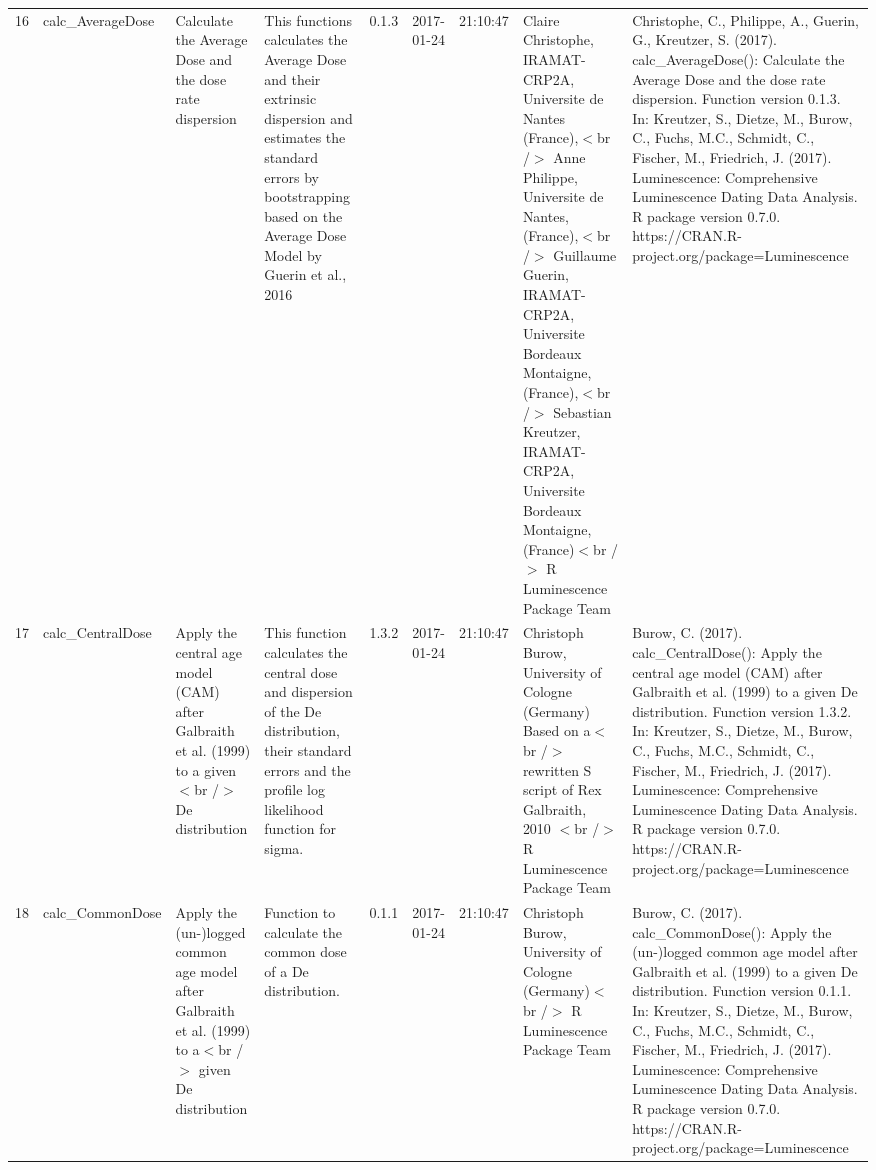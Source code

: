 \begin{table}[ht]
\begin{tabular}{rllllllll}
 \\ 
  16 & calc\_AverageDose & Calculate the Average Dose and the dose rate dispersion & This functions calculates the Average Dose and their extrinsic dispersion and estimates the standard errors by bootstrapping based on the Average Dose Model by Guerin et al., 2016 & 0.1.3 & 2017-01-24 & 21:10:47
 & Claire Christophe, IRAMAT-CRP2A, Universite de Nantes (France),$<$br /$>$ Anne Philippe, Universite de Nantes, (France),$<$br /$>$ Guillaume Guerin, IRAMAT-CRP2A, Universite Bordeaux Montaigne, (France),$<$br /$>$ Sebastian Kreutzer, IRAMAT-CRP2A, Universite Bordeaux Montaigne, (France)$<$br /$>$  R Luminescence Package Team & Christophe, C., Philippe, A., Guerin, G., Kreutzer, S. (2017). calc\_AverageDose(): Calculate the Average Dose and the dose rate dispersion. Function version 0.1.3. In: Kreutzer, S., Dietze, M., Burow, C., Fuchs, M.C., Schmidt, C., Fischer, M., Friedrich, J. (2017). Luminescence: Comprehensive Luminescence Dating Data Analysis. R package version 0.7.0. https://CRAN.R-project.org/package=Luminescence
 \\ 
  17 & calc\_CentralDose & Apply the central age model (CAM) after Galbraith et al. (1999) to a given$<$br /$>$ De distribution & This function calculates the central dose and dispersion of the De distribution, their standard errors and the profile log likelihood function for sigma. & 1.3.2 & 2017-01-24 & 21:10:47
 & Christoph Burow, University of Cologne (Germany)   Based on a$<$br /$>$ rewritten S script of Rex Galbraith, 2010  $<$br /$>$  R Luminescence Package Team & Burow, C. (2017). calc\_CentralDose(): Apply the central age model (CAM) after Galbraith et al. (1999) to a given De distribution. Function version 1.3.2. In: Kreutzer, S., Dietze, M., Burow, C., Fuchs, M.C., Schmidt, C., Fischer, M., Friedrich, J. (2017). Luminescence: Comprehensive Luminescence Dating Data Analysis. R package version 0.7.0. https://CRAN.R-project.org/package=Luminescence
 \\ 
  18 & calc\_CommonDose & Apply the (un-)logged common age model after Galbraith et al. (1999) to a$<$br /$>$ given De distribution & Function to calculate the common dose of a De distribution. & 0.1.1 & 2017-01-24 & 21:10:47
 & Christoph Burow, University of Cologne (Germany)$<$br /$>$  R Luminescence Package Team & Burow, C. (2017). calc\_CommonDose(): Apply the (un-)logged common age model after Galbraith et al. (1999) to a given De distribution. Function version 0.1.1. In: Kreutzer, S., Dietze, M., Burow, C., Fuchs, M.C., Schmidt, C., Fischer, M., Friedrich, J. (2017). Luminescence: Comprehensive Luminescence Dating Data Analysis. R package version 0.7.0. https://CRAN.R-project.org/package=Luminescence

\end{tabular}
\end{table}
